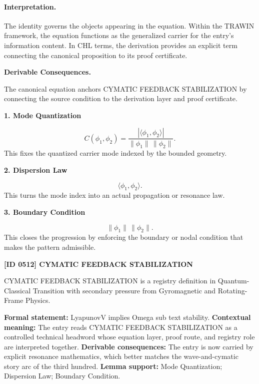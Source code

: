 \paragraph{Interpretation.}
The identity governs the objects appearing in the equation. Within the TRAWIN framework, the equation functions as the generalized carrier for the entry’s information content. In CHL terms, the derivation provides an explicit term connecting the canonical proposition to its proof certificate.

\par\vspace{0.35em}
\noindent\textbf{Derivable Consequences.}\quad
\begingroup
\footnotesize
\raggedright
The canonical equation anchors CYMATIC FEEDBACK STABILIZATION by connecting the source condition to the derivation layer and proof certificate.
\par\endgroup

\noindent\textbf{1. Mode Quantization}\par
\[
C(\phi_1,\phi_2) = \frac{ \left|\langle \phi_1,\phi_2\rangle\right| }{ \lVert \phi_1\rVert\,\lVert \phi_2\rVert }.
\]
\noindent This fixes the quantized carrier mode indexed by the bounded geometry.\par
\noindent\textbf{2. Dispersion Law}\par
\[
\langle \phi_1,\phi_2\rangle.
\]
\noindent This turns the mode index into an actual propagation or resonance law.\par
\noindent\textbf{3. Boundary Condition}\par
\[
\lVert \phi_1\rVert\,\lVert \phi_2\rVert.
\]
\noindent This closes the progression by enforcing the boundary or nodal condition that makes the pattern admissible.\par

\clearpage
\noindent\textbf{[ID 0512] CYMATIC FEEDBACK STABILIZATION}\par
\vspace{0.35em}
\begingroup\small
{}
CYMATIC FEEDBACK STABILIZATION is a registry definition in Quantum-Classical Transition with secondary pressure from Gyromagnetic and Rotating-Frame Physics.

\begingroup\footnotesize\setlength{\emergencystretch}{3em}\sloppy
\textbf{Formal statement:} LyapunovV implies Omega sub text stability. \textbf{Contextual meaning:} The entry reads CYMATIC FEEDBACK STABILIZATION as a controlled technical headword whose equation layer, proof route, and registry role are interpreted together. \textbf{Derivable consequences:} The entry is now carried by explicit resonance mathematics, which better matches the wave-and-cymatic story arc of the third hundred. \textbf{Lemma support:} Mode Quantization; Dispersion Law; Boundary Condition.\par
\endgroup

